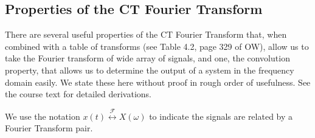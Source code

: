 \subsection{Properties of the CT Fourier Transform}

There are several useful properties of the CT Fourier Transform that, when combined with a table of transforms (see Table 4.2, page 329 of OW), allow us to take the Fourier transform of  wide array of signals, and one, the convolution property, that allows us to determine the output of a system in the frequency domain easily. We state these here without proof in rough order of usefulness. See the course text for detailed derivations.

We use the notation $x(t) \stackrel{\mathcal{F}}{\longleftrightarrow} X(\omega)$ to indicate the signals are related by a Fourier Transform pair.
